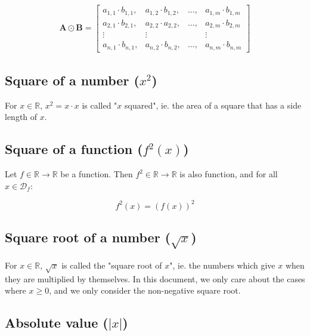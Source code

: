 \documentclass{article}
\begin{document}
        \begin{align*}
          \mathbf{A} \odot \mathbf{B}
            = \begin{bmatrix}
                a_{1,1} \cdot b_{1,1},
                  & a_{1,2} \cdot b_{1,2},
                  & \ldots,
                  & a_{1,m} \cdot b_{1,m} \\
                a_{2,1} \cdot b_{2,1},
                  & a_{2,2} \cdot a_{2,2},
                  & \ldots,
                  & a_{2,m} \cdot b_{2,m}\\
                \vdots & \vdots & & \vdots \\
                a_{n,1} \cdot b_{n,1},
                  & a_{n,2} \cdot b_{n,2},
                  & \ldots,
                  & a_{n,m} \cdot b_{n,m}
              \end{bmatrix}
        \end{align*}

      \subsection{Square of a number ($x^2$)}

        For $x \in \mathbb{R}$, $x^2 = x \cdot x$ is called "$x$ squared", ie.
        the area of a square that has a side length of $x$.

      \subsection{Square of a function ($f^2(x)$)}

        Let $f \in \mathbb{R} \rightarrow \mathbb{R}$ be a function. Then
        $f^2 \in \mathbb{R} \rightarrow \mathbb{R}$ is also function, and for
        all $x \in \mathcal{D}_f$:

        $$f^2(x) = \left( f(x) \right)^2$$

      \subsection{Square root of a number ($\sqrt{x}$)}

        For $x \in \mathbb{R}$, $\sqrt{x}$ is called the "square root of $x$",
        ie.  the numbers which give $x$ when they are multiplied by
        themselves. In this document, we only care about the cases where
        $x \geq 0$, and we only consider the non-negative square root.

      \subsection{Absolute value ($|x|$)}
\end{document}
